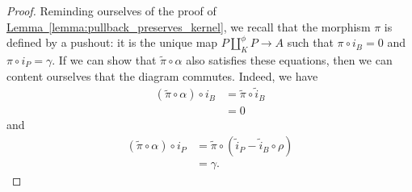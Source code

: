 \documentclass[main.tex]{subfiles}
\begin{document}
\begin{proof}
  Reminding ourselves of the proof of \hyperref[lemma:pullback_preserves_kernel]{Lemma~\ref*{lemma:pullback_preserves_kernel}}, we recall that the morphism $\pi$ is defined by a pushout: it is the unique map $P \amalg_{K}^{\phi} P \to A$ such that $\pi \circ i_{B} = 0$ and $\pi \circ i_{P} = \gamma$. If we can show that $\tilde{\pi} \circ \alpha$ also satisfies these equations, then we can content ourselves that the diagram commutes. Indeed, we have
  \begin{align*}
    (\tilde{\pi} \circ \alpha) \circ i_{B} &= \tilde{\pi} \circ \tilde{i}_{B} \\
    &= 0
  \end{align*}
  and
  \begin{align*}
    (\tilde{\pi} \circ \alpha) \circ i_{P} &= \tilde{\pi} \circ (\tilde{i}_{P} - \tilde{i}_{B} \circ \rho) \\
    &= \gamma.
  \end{align*}


\end{proof}
\end{document}
